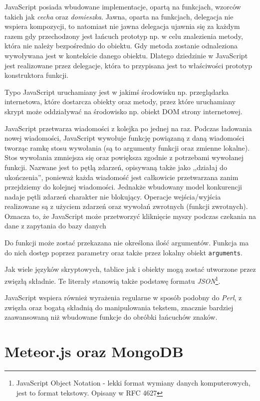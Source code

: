 JavaScript posiada wbudowane implementacje, opartą na funkcjach, wzorców takich jak \textit{cecha} oraz \textit{domieszka}. Jawna, oparta na funkcjach, delegacja nie wspiera kompozycji, to natomiast nie jawna delegacja ujawnia się za każdym razem gdy przechodzony jest łańcuch prototyp np. w celu znalezienia metody, która nie należy bezpośrednio do obiektu. Gdy metoda zostanie odnaleziona wywoływana jest w kontekście danego obiektu. Dlatego dziedzinie w JavaScript jest realizowane przez delegacje, która to przypisana jest to właściwości prototyp konstruktora funkcji\cite{jsWiki}.

Typo JavaScript uruchamiany jest w jakimś środowisku np. przeglądarka internetowa, które dostarcza obiekty oraz metody, przez które uruchamiany skrypt może oddziaływać na środowisko np. obiekt DOM strony internetowej. 

JavaScript przetwarza wiadomości z kolejka po jednej na raz. Podczas ładowania nowej wiadomości, JavaScript wywołuje funkcję powiązaną z daną wiadomości tworząc ramkę stosu wywołania (są to argumenty funkcji oraz zmienne lokalne). Stos wywołania zmniejsza się oraz powiększa zgodnie z potrzebami wywołanej funkcji. Nazwane jest to pętlą zdarzeń, opisywaną także jako ,,działaj do ukończenia'', ponieważ każda wiadomość jest całkowicie przetwarzana zanim przejdziemy do kolejnej wiadomości. Jednakże wbudowany model konkurencji nadaje pętli zdarzeń charakter nie blokujący. Operacje wejścia/wyjścia realizowane są z użyciem zdarzeń oraz wywołań zwrotnych (funkcji zwrotnych). Oznacza to, że JavaScript może przetworzyć kliknięcie myszy podczas czekania na dane z zapytania do bazy danych\cite{jsWiki}

Do funkcji może zostać przekazana nie określona ilość argumentów. Funkcja ma do nich dostęp poprzez parametry oraz także przez lokalny obiekt \verb|arguments|\cite{jsWiki}.

Jak wiele języków skryptowych, tablice jak i obiekty mogą zostać utworzone przez zwięzłą składnie. Te literały stanowią także podstawę formatu \emph{JSON}\footnote{JavaScript Object Notation - lekki format wymiany danych komputerowych, jest to format tekstowy. Opisany w RFC 4627}\cite{jsWiki}.

JavaScript wspiera również wyrażenia regularne w sposób podobny do \emph{Perl}, z zwięzła oraz bogatą składnią do manipulowania tekstem, znacznie bardziej zaawansowaną niż wbudowane funkcje do obróbki łańcuchów znaków.

\section{Meteor.js oraz MongoDB}

